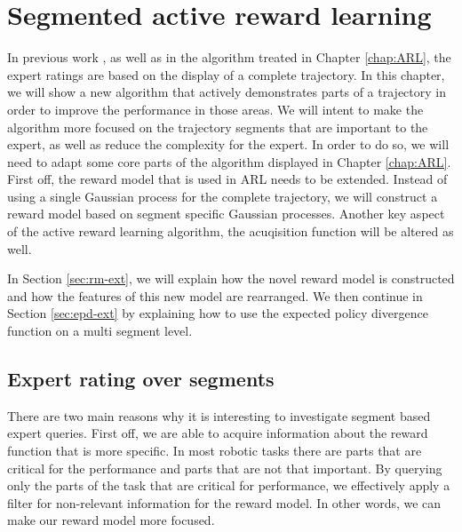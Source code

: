 \documentclass[mscThesis.tex]{subfiles}
\begin{document}
\chapter{Segmented active reward learning}
\label{chap:SARL}
In previous work \cite{Daniel2015}, as well as in the algorithm treated in Chapter \ref{chap:ARL}, the expert ratings are based on the display of a complete trajectory. In this chapter, we will show a new algorithm that actively demonstrates parts of a trajectory in order to improve the performance in those areas. We will intent to make the algorithm more focused on the trajectory segments that are important to the expert, as well as reduce the complexity for the expert. In order to do so, we will need to adapt some core parts of the algorithm displayed in Chapter \ref{chap:ARL}. First off, the reward model that is used in ARL needs to be extended. Instead of using a single Gaussian process for the complete trajectory, we will construct a reward model based on segment specific Gaussian processes. Another key aspect of the active reward learning algorithm, the acuqisition function will be altered as well. 

In Section \ref{sec:rm-ext}, we will explain how the novel reward model is constructed and how the features of this new model are rearranged. We then continue in Section \ref{sec:epd-ext} by explaining how to use the expected policy divergence function on a multi segment level.

\section{Expert rating over segments}
There are two main reasons why it is interesting to investigate segment based expert queries. First off, we are able to acquire information about the reward function that is more specific. In most robotic tasks there are parts that are critical for the performance and parts that are not that important. By querying only the parts of the task that are critical for performance, we effectively apply a filter for non-relevant information for the reward model. In other words, we can make our reward model more focused. 
\end{document}
